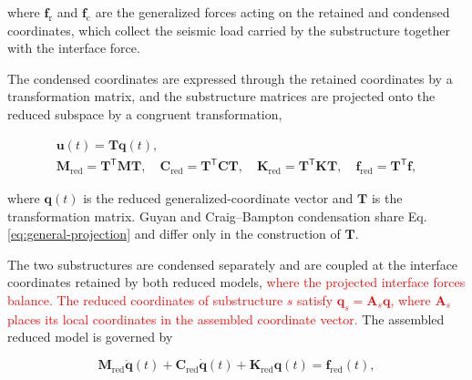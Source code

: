 \documentclass[a4paper,fleqn,review,12pt]{cas-sc}
\numberwithin{equation}{section}
\newcommand{\rev}[1]{\textcolor{red}{#1}}
\begin{document}
\noindent where \(\bm{f}_{\mathrm{r}}\) and \(\bm{f}_{\mathrm{c}}\) are the generalized forces acting on the retained and condensed coordinates, which collect the seismic load carried by the substructure together with the interface force.

The condensed coordinates are expressed through the retained coordinates by a transformation matrix, and the substructure matrices are projected onto the reduced subspace by a congruent transformation,

\vspace{-3.5em}
\begin{equation}
	\begin{gathered}
		\bm{u}(t)=\mathbf{T}\bm{q}(t),\\
		\mathbf{M}_{\mathrm{red}}=\mathbf{T}^{\mathsf{T}}\mathbf{M}\mathbf{T},\quad
		\mathbf{C}_{\mathrm{red}}=\mathbf{T}^{\mathsf{T}}\mathbf{C}\mathbf{T},\quad
		\mathbf{K}_{\mathrm{red}}=\mathbf{T}^{\mathsf{T}}\mathbf{K}\mathbf{T},\quad
		\bm{f}_{\mathrm{red}}=\mathbf{T}^{\mathsf{T}}\bm{f},
	\end{gathered}
	\label{eq:general-projection}
\end{equation}
\vspace{-3.5em}

\noindent where \(\bm{q}(t)\) is the reduced generalized-coordinate vector and \(\mathbf{T}\) is the transformation matrix. Guyan and Craig--Bampton condensation share Eq. \eqref{eq:general-projection} and differ only in the construction of \(\mathbf{T}\).

The two substructures are condensed separately and are coupled at the interface coordinates retained by both reduced models, \rev{where the projected interface forces balance. The reduced coordinates of substructure \(s\) satisfy \(\bm q_s=\mathbf A_s\bm q\), where \(\mathbf A_s\) places its local coordinates in the assembled coordinate vector.} The assembled reduced model is governed by

\vspace{-3.5em}
\begin{equation}
	\mathbf{M}_{\mathrm{red}}\ddot{\bm{q}}(t)
	+\mathbf{C}_{\mathrm{red}}\dot{\bm{q}}(t)
	+\mathbf{K}_{\mathrm{red}}\bm{q}(t)
	=\bm{f}_{\mathrm{red}}(t),
	\label{eq:assembled-reduced}
\end{equation}
\vspace{-3.5em}
\end{document}
